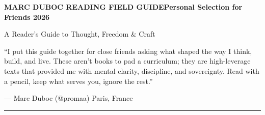 \documentclass[10pt]{article}
\begin{document}
\noindent
{\footnotesize\bfseries\color{inkmuted}\MakeUppercase{Marc Duboc \textperiodcentered{} Reading Field Guide}\hfill{\mdseries\color{inkfaint}Personal Selection for Friends \textperiodcentered{} 2026}}\par\vspace{4mm}
{\huge\fraunces\color{ink}A Reader’s Guide to Thought, Freedom \& Craft}\par\vspace{4mm}
\begin{prologuebox}
  {\small\frauncesit\color{inksoft}“I put this guide together for close friends asking what shaped the way I think, build, and live. These aren’t books to pad a curriculum; they are high-leverage texts that provided me with mental clarity, discipline, and sovereignty. Read with a pencil, keep what serves you, ignore the rest.”}\par\vspace{2mm}
  {\footnotesize\color{inkfaint}— Marc Duboc (@promaa) \textperiodcentered{} Paris, France}
\end{prologuebox}\par\vspace{4mm}
\par\vspace{1mm}\textcolor{rulestrong}{\rule{\linewidth}{0.5pt}}\par\vspace{4mm}
\end{document}
